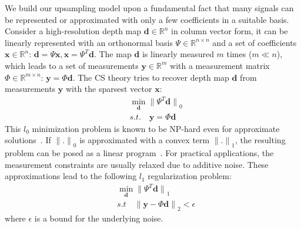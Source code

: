 \documentclass[preprint,10pt,5p,times,twocolumn]{elsarticle}
\begin{document}
We build our upsampling model upon a fundamental fact that many signals can be represented or approximated with only a few coefficients in a suitable basis.
Consider a high-resolution depth map $\mathbf{d}\in{\mathbb{R}}^{n}$ in column vector form, it can be linearly represented with an orthonormal basis $\Psi\in{\mathbb{R}}^{n\times n}$ and a set of coefficients $\mathbf{x}\in{\mathbb{R}}^{n}$: $\mathbf{d} = \Psi\mathbf{x},\mathbf{x}=\Psi^{T}\mathbf{d}$. The map $\mathbf{d}$ is linearly measured $m$ times ($m\ll n$), which leads to a set of measurements $\mathbf{y}\in{\mathbb{R}}^{m}$ with a measurement matrix $\Phi\in{\mathbb{R}}^{m\times n}$: $\mathbf{y}=\Phi\mathbf{d}$. The CS theory tries to recover depth map $\mathbf{d}$ from measurements $\mathbf{y}$ with the sparsest vector $\mathbf{x}$:
\begin{equation}
\begin{split}
\label{eq:cs_l0}
&\min_{\mathbf{d}}{{\|\Psi^{T}\mathbf{d}\|}_{0}} \\
&s.t. \quad \mathbf{y} = \Phi\mathbf{d}
\end{split}
\end{equation}
This $l_{0}$ minimization problem is known to be NP-hard even for approximate solutions~\cite{Muthu05}. If ${{\|.\|}_{0}}$ is approximated with a convex term ${{\|.\|}_{1}}$, the resulting problem can be posed as a linear program~\cite{CDS98}. For practical applications, the measurement constraints are usually relaxed due to additive noise. These approximations lead to the following $l_{1}$ regularization problem:
\begin{equation}
\begin{split}
\label{eq:cs_l1}
&\min_{\mathbf{d}}{{\|\Psi^{T}\mathbf{d}\|}_{1}} \\
&s.t \quad {\|\mathbf{y} - \Phi\mathbf{d}\|}_{2} <\epsilon
\end{split}
\end{equation}
where $\epsilon$ is a bound for the underlying noise.
\end{document}
